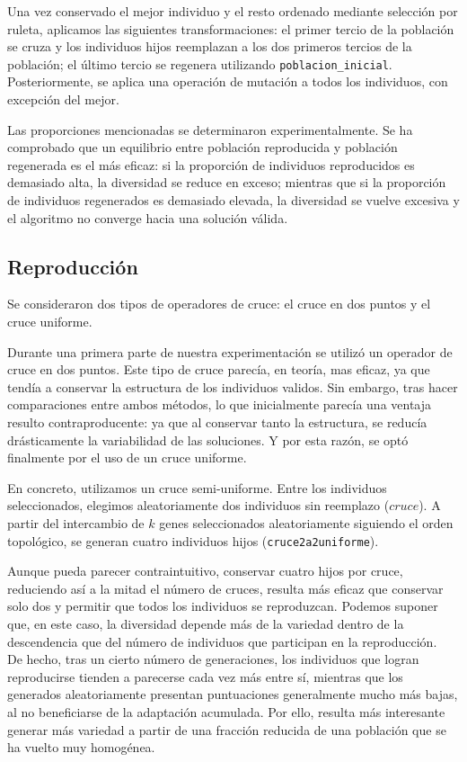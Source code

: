 \documentclass[12pt,a4paper]{report}
\begin{document}
    Una vez conservado el mejor individuo y el resto ordenado mediante selección por ruleta, aplicamos las siguientes transformaciones: el primer tercio de la población se cruza y los individuos hijos reemplazan a los dos primeros tercios de la población; el último tercio se regenera utilizando \texttt{poblacion\_inicial}.
    Posteriormente, se aplica una operación de mutación a todos los individuos, con excepción del mejor.

    Las proporciones mencionadas se determinaron experimentalmente. Se ha comprobado que un equilibrio entre población reproducida y población regenerada es el más eficaz: si la proporción de individuos reproducidos es demasiado alta, la diversidad se reduce en exceso; mientras que si la proporción de individuos regenerados es demasiado elevada, la diversidad se vuelve excesiva y el algoritmo no converge hacia una solución válida.

    \subsection{Reproducción}
    Se consideraron dos tipos de operadores de cruce: el cruce en dos puntos y el cruce uniforme.

    Durante una primera parte de nuestra experimentación se utilizó un operador de cruce en dos puntos. Este tipo de cruce parecía, en teoría, mas eficaz, ya que tendía a conservar la estructura de los individuos validos. Sin embargo, tras hacer comparaciones entre ambos métodos, lo que inicialmente parecía una ventaja resulto contraproducente: ya que al conservar tanto la estructura, se reducía drásticamente la variabilidad de las soluciones. Y por esta razón, se optó finalmente por el uso de un cruce uniforme.

    En concreto, utilizamos un cruce semi-uniforme. Entre los individuos seleccionados, elegimos aleatoriamente dos individuos sin reemplazo ($cruce$). A partir del intercambio de $k$ genes seleccionados aleatoriamente siguiendo el orden topológico, se generan cuatro individuos hijos (\texttt{cruce2a2uniforme}).

    Aunque pueda parecer contraintuitivo, conservar cuatro hijos por cruce, reduciendo así a la mitad el número de cruces, resulta más eficaz que conservar solo dos y permitir que todos los individuos se reproduzcan. Podemos suponer que, en este caso, la diversidad depende más de la variedad dentro de la descendencia que del número de individuos que participan en la reproducción.\\
    De hecho, tras un cierto número de generaciones, los individuos que logran reproducirse tienden a parecerse cada vez más entre sí, mientras que los generados aleatoriamente presentan puntuaciones generalmente mucho más bajas, al no beneficiarse de la adaptación acumulada. Por ello, resulta más interesante generar más variedad a partir de una fracción reducida de una población que se ha vuelto muy homogénea.
\end{document}

